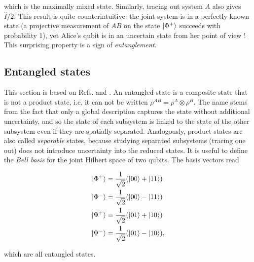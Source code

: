 \noindent which is the maximally mixed state. Similarly, tracing out system $A$ also gives $\hat{I}/2$. This result is quite counterintuitive: the joint system is in a perfectly known state (a projective measurement of $AB$ on the state $\ket{\Phi^+}$ succeeds with probability 1), yet Alice's qubit is in an uncertain state from her point of view ! This surprising property is a sign of \textit{entanglement}.



\subsection{Entangled states}

This section is based on Refs. \cite{horodecki_quantum_2009} and \cite{brunner_bell_2014}. An entangled state is a composite state that is not a product state, i.e. it can not be written $\rho^{AB} = \rho^A \otimes \rho^B$. The name stems from the fact that only a global description captures the state without additional uncertainty, and so the state of each subsystem is linked to the state of the other subsystem even if they are spatially separated. Analogously, product states are also called \textit{separable} states, because studying separated subsystems (tracing one out) does not introduce uncertainty into the reduced states. It is useful to define the \textit{Bell basis} for the joint Hilbert space of two qubits. The basis vectors read

\begin{align}
    \ket{\Phi^+} &= \frac{1}{\sqrt{2}} (\ket{00} + \ket{11})\\
    \ket{\Phi^-} &= \frac{1}{\sqrt{2}} (\ket{00} - \ket{11})\\
    \ket{\Psi^+} &= \frac{1}{\sqrt{2}} (\ket{01} + \ket{10})\\
    \ket{\Psi^-} &= \frac{1}{\sqrt{2}} (\ket{01} - \ket{10}),
\end{align}

\noindent which are all entangled states. %

